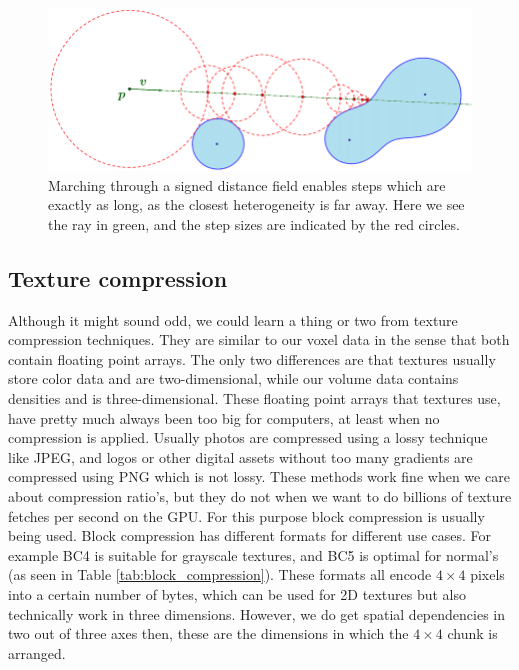 \begin{figure}
    \centering
    \includegraphics[width=0.9\linewidth]{figures/sdf_ray_marching.png}
    \caption{Marching through a signed distance field enables steps which are exactly as long, as the closest heterogeneity is far away. Here we see the ray in green, and the step sizes are indicated by the red circles. \cite{SDF_sphere_marching}}
    \label{fig:SDF_marching}
\end{figure}



\subsection{Texture compression} \label{related_work:texture_compression}
Although it might sound odd, we could learn a thing or two from texture compression techniques. They are similar to our voxel data in the sense that both contain floating point arrays. The only two differences are that textures usually store color data and are two-dimensional, while our volume data contains densities and is three-dimensional. These floating point arrays that textures use, have pretty much always been too big for computers, at least when no compression is applied. Usually photos are compressed using a lossy technique like JPEG, and logos or other digital assets without too many gradients are compressed using PNG which is not lossy. These methods work fine when we care about compression ratio's, but they do not when we want to do billions of texture fetches per second on the GPU. For this purpose block compression is usually being used\cite{BlockCompression}. Block compression has different formats for different use cases. For example BC4 is suitable for grayscale textures, and BC5 is optimal for normal's (as seen in Table \ref{tab:block_compression}). These formats all encode $4\times 4$ pixels into a certain number of bytes, which can be used for 2D textures but also technically work in three dimensions. However, we do get spatial dependencies in two out of three axes then, these are the dimensions in which the $4\times 4$ chunk is arranged.


